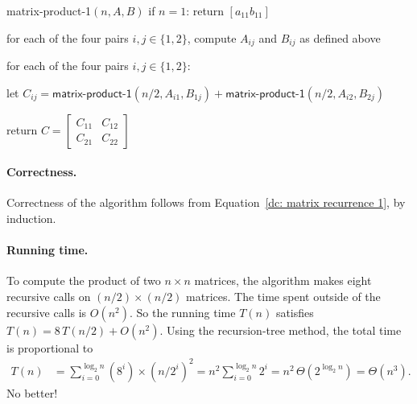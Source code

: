 \begin{myframed}
\begin{steps}
  \item[] {\sf matrix-product-1}$(n, A, B)$
    \step if $n = 1$: return $[a_{11} b_{11}]$

    \step for each of the four pairs $i,j\in \{1,2\}$,
    compute $A_{ij}$ and $B_{ij}$ as defined above

    \step for each of the four pairs $i,j\in \{1,2\}$:
    \begin{block}
      \step let $C_{ij}
      = \textsf{matrix-product-1}(n/2, A_{i1}, B_{1j})
      + \textsf{matrix-product-1}(n/2, A_{i2}, B_{2j})
      $
    \end{block}

    \step return $C = \left[ \begin{array}{ll} C_{11} & C_{12} \\C_{21} & C_{22}\end{array}\right]$
  \end{steps}
\end{myframed}

\paragraph{Correctness.}
Correctness of the algorithm follows
from Equation~\eqref{dc: matrix recurrence 1}, by induction.

\paragraph{Running time.}
To compute the product of two $n\times n$ matrices,
the algorithm makes eight recursive calls on $(n/2) \times (n/2)$ matrices.
The time spent outside of the recursive calls is $O(n^2)$.
So the running time $T(n)$ satisfies
$T(n) = 8\,T(n/2) + O(n^2)$.
Using the recursion-tree method, the total time is proportional to
\begin{align*}
  T(n) & = \sum_{i=0}^{\log_2 n} (8^i)\times (n/2^i)^2 
    = n^2 \sum_{i=0}^{\log_2 n} 2^i
  = n^2\, \Theta(2^{\log_2 n})
  = \Theta(n^3).
\end{align*}
No better!

